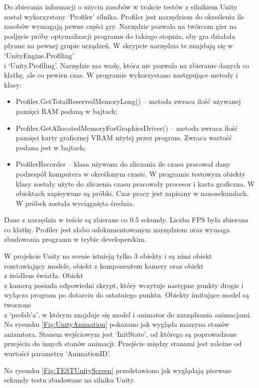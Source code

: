 \documentclass[12pt,twoside]{article}
\begin{document}
Do zbierania informacji o użyciu zasobów w trakcie testów z silnikiem Unity
został wykorzystany ‘Profiler’ silnika. Profiler jest narzędziem do określenia
ile zasobów wymagają pewne części gry. Narzędzie pozwala na twórcom gier na
podjęcie próby optymalizacji programu do takiego stopnia, aby gra działała
płynne na pewnej grupie urządzeń. W skrypcie narzędzia te znajdują się w
‘UnityEngine.Profiling’\\i ‘Unity.Profiling’. Narzędzie ma wadę, która nie
pozwala na zbieranie danych co klatkę, ale co pewien czas. W programie
wykorzystano następujące metody i klasy:
\begin{itemize}
\item Profiler.GetTotalReservedMemoryLong() – metoda zwraca ilość używanej
pamięci RAM podaną w bajtach; 
\item Profiler.GetAllocatedMemoryForGraphicsDriver() – metoda zwraca ilość
pamięci karty graficznej VRAM użytej przez program. Zwraca wartość podana jest w
bajtach; 
\item ProfilerRecorder – klasa używana do zliczania ile czasu pracował dany
podzespół komputera w określonym czasie. W programie testowym obiekty klasy
zostały użyte do zliczenia czasu pracowały procesor i karta graficzna. W
obiektach zapisywane są próbki. Czas pracy jest zapisany w nanosekundach. W
próbek została wyciągnięta średnia.
\end{itemize}
Dane z narzędzia w teście są zbierane co 0.5 sekundy. Liczba FPS była zbierana
co klatkę. Profiler jest słabo udokumentowanym narzędziem oraz wymaga zbudowania
programu w trybie developerskim.

W projekcie Unity na scenie istnieją tylko 3 obiekty i są nimi obiekt
rozstawiający modele, obiekt z komponentem kamery oraz obiekt\\z źródłem światła.
Obiekt\\z kamerą posiada odpowiedni skrypt, który wczytuje następne punkty drogie
i wyłącza program po dotarciu do ostatniego punktu. Obiekty imitujące model są
tworzone\\z ‘prefab’a’, w którym znajduje się model i animator do zarządzania
animacjami. Na rysunku \ref{Fig:UnityAnimation} pokazano jak wygląda maszyna
stanów aniamtora. Stanem wejściowym jest ‘InitState’, od którego są poprowadzone
przejścia do innych stanów animacji. Przejście między stanami jest zależne od
wartości parametru ‘AnimationID’. 



Na rysunku \ref{Fig:TESTUnityScreen} przedstawiono jak wyglądają pierwsze sekundy testu zbudowane na silniku Unity. 
\end{document}
